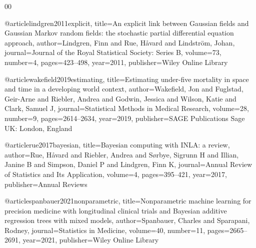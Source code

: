 \documentclass[preprint,12pt]{elsarticle}
\begin{document}
\begin{thebibliography}{00}
{@article{lindgren2011explicit,
  title={{An explicit link between Gaussian fields and Gaussian Markov random fields: the stochastic partial differential equation approach}},
  author={Lindgren, Finn and Rue, H{\aa}vard and Lindstr{\"o}m, Johan},
  journal={Journal of the Royal Statistical Society: Series B},
  volume={73},
  number={4},
  pages={423--498},
  year={2011},
  publisher={Wiley Online Library}
}

@article{wakefield2019estimating,
  title={{Estimating under-five mortality in space and time in a developing world context}},
  author={Wakefield, Jon and Fuglstad, Geir-Arne and Riebler, Andrea and Godwin, Jessica and Wilson, Katie and Clark, Samuel J},
  journal={Statistical Methods in Medical Research},
  volume={28},
  number={9},
  pages={2614--2634},
  year={2019},
  publisher={SAGE Publications Sage UK: London, England}
}

@article{rue2017bayesian,
  title={{Bayesian computing with INLA: a review}},
  author={Rue, H{\aa}vard and Riebler, Andrea and S{\o}rbye, Sigrunn H and Illian, Janine B and Simpson, Daniel P and Lindgren, Finn K},
  journal={Annual Review of Statistics and Its Application},
  volume={4},
  pages={395--421},
  year={2017},
  publisher={Annual Reviews}
}

@article{spanbauer2021nonparametric,
  title={{Nonparametric machine learning for precision medicine with longitudinal clinical trials and Bayesian additive regression trees with mixed models}},
  author={Spanbauer, Charles and Sparapani, Rodney},
  journal={Statistics in Medicine},
  volume={40},
  number={11},
  pages={2665--2691},
  year={2021},
  publisher={Wiley Online Library}
}

}
\end{thebibliography}
\end{document}
